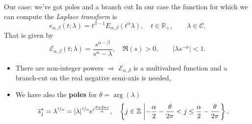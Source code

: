 \documentclass[aspectratio=169,xcolor=dvipsnames]{beamer}
\begin{document}
\begin{frame}{Our case: we've got poles and a branch cut}
In our case the function for which we can compute the \emph{Laplace transform} is
\[
e_{\alpha,\beta}(t;\lambda) = t^{\beta - 1} E_{\alpha,\beta}(t^\alpha \lambda), \quad t \in \mathbb{R}_+, \qquad \lambda \in \mathcal{C}.
\]
That is given by
\[
\mathcal{E}_{\alpha,\beta}(t;\lambda) = \frac{s^{\alpha-\beta}}{s^\alpha - \lambda}, \quad \Re(s) > 0, \qquad |\lambda s^{-\alpha}| < 1.
\]
\begin{itemize}
	\item<2-> There are non-integer powers $\Rightarrow$ $\mathcal{E}_{\alpha,\beta}$ is a \alert{multivalued function} and a branch-cut on the real negative semi-axis is needed,
	\item<3-> We have also the \textbf{poles} for $\theta = \arg(\lambda)$
	\[ \overline{s}^*_j = \lambda^{\nicefrac{1}{\alpha}} = | \lambda |^{\nicefrac{1}{\alpha}} e^{i\frac{\theta + 2\pi j}{\alpha}}, \quad \left\lbrace j \in \mathbb{Z} \,\left| - \frac{\alpha}{2} - \frac{\theta}{2\pi} < j \leq \frac{\alpha}{2} - \frac{\theta}{2\pi} \right. \right\rbrace, \] 
\end{itemize}
\end{frame}
\end{document}
